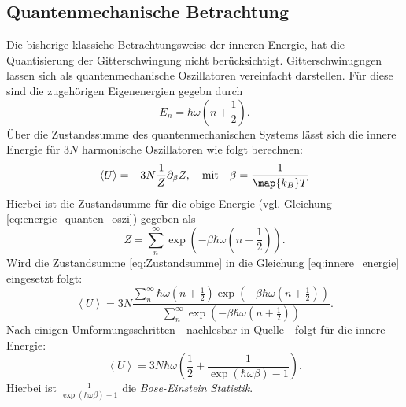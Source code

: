 \subsection{Quantenmechanische Betrachtung}
Die bisherige klassiche Betrachtungsweise der inneren Energie, hat die
Quantisierung der Gitterschwingung nicht berücksichtigt.
Gitterschwinugngen lassen sich als quantenmechanische Oszillatoren vereinfacht darstellen. Für diese
sind die zugehörigen Eigenenergien gegebn durch
\begin{equation}
  \label{eq:energie_quanten_oszi}
  E_n = \hbar \omega \left(n + \frac{1}{2}\right).
\end{equation}
Über die Zustandssumme des quantenmechanischen Systems lässt sich die innere Energie
für $3N$ harmonische Oszillatoren wie folgt berechnen:
\begin{equation}
  \label{eq:innere_energie}
  \left<U\right> = -3N\frac{1}{Z}\partial_\beta Z, \quad \text{mit} \quad \beta = \frac{1}{\map{k_B}T}
\end{equation}
Hierbei ist die Zustandsumme für die obige Energie (vgl. Gleichung \eqref{eq:energie_quanten_oszi})
gegeben als
\begin{equation}
  \label{eq:Zustandsumme}
  Z = \sum_n^\infty \exp\left(-\beta\hbar\omega\left(n+\frac{1}{2}\right)\right).
\end{equation}
Wird die Zustandsumme \eqref{eq:Zustandsumme} in die Gleichung \eqref{eq:innere_energie}
eingesetzt folgt:
\begin{equation*}
  \left<U\right>= 3N  \frac{ \sum_n^\infty \hbar\omega\left( n+ \frac{1}{2} \right)\exp\left(-\beta\hbar\omega\left( n+\frac{1}{2} \right) \right) }{ \sum_n^\infty \exp\left( -\beta\hbar\omega\left( n+\frac{1}{2} \right) \right)}.
\end{equation*}
Nach einigen Umformungsschritten - nachlesbar in Quelle \cite[S. 220]{marx} - folgt für die innere Energie:
\begin{equation}
  \label{eq:innere_Energie_Quantenmechanik_diskrete}
  \left<U\right> = 3N\hbar\omega\left(\frac{1}{2} + \frac{1}{\exp\left(\hbar\omega\beta\right) -1}\right).
\end{equation}
Hierbei ist $\frac{1}{\exp\left(\hbar\omega\beta\right) -1}$ die \emph{Bose-Einstein Statistik}.

